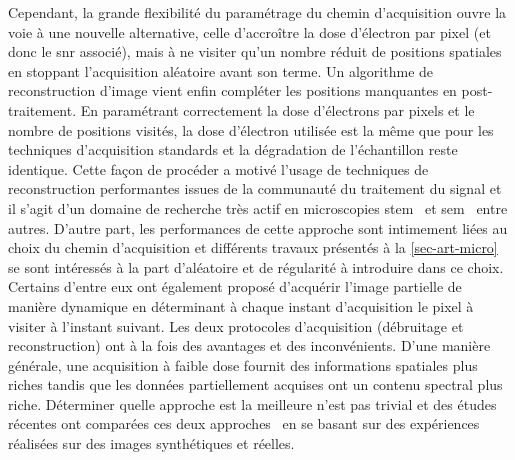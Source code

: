     Cependant, la grande flexibilité du paramétrage du chemin d'acquisition ouvre la voie à une nouvelle alternative, celle d'accroître la dose d'électron par pixel (et donc le \gls{snr} associé), mais à ne visiter qu'un nombre réduit de positions spatiales en stoppant l'acquisition aléatoire avant son terme. Un algorithme de reconstruction d'image vient enfin compléter les positions manquantes en post-traitement. En paramétrant correctement la dose d'électrons par pixels et le nombre de positions visités, la dose d'électron utilisée est la même que pour les techniques d'acquisition standards et la dégradation de l'échantillon reste identique. 
    Cette façon de procéder a motivé l'usage de techniques de reconstruction performantes issues de la communauté du traitement du signal et il s'agit d'un domaine de recherche très actif en microscopies \gls{stem}~\cite{beche2016compressed,stevens2014potential} et \gls{sem}~\cite{anderson2013sparse} entre autres.
    D'autre part, les performances de cette approche sont intimement liées au choix du chemin d'acquisition et différents travaux présentés à la \cref{sec-art-micro} se sont intéressés à la part d'aléatoire et de régularité à introduire dans ce choix. Certains d'entre eux ont également proposé d'acquérir l'image partielle de manière dynamique en déterminant à chaque instant d'acquisition le pixel à visiter à l'instant suivant.
    Les deux protocoles d'acquisition (débruitage et reconstruction) ont à la fois des avantages et des inconvénients. D'une manière générale, une acquisition à faible dose fournit des informations spatiales plus riches tandis que les données partiellement acquises ont un contenu spectral plus riche. Déterminer quelle approche est la meilleure n'est pas trivial et des études récentes ont comparées ces deux approches~\cite{trampert2018ultramicroscopy,sanders2020inpainting,sanders2018inpainting} en se basant sur des expériences réalisées sur des images synthétiques et réelles.
    
